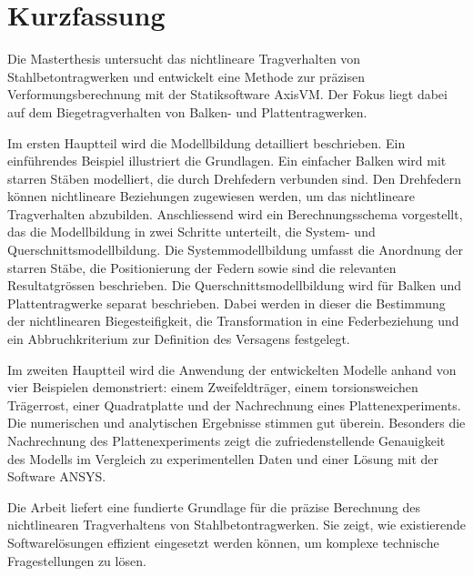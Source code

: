 \chapter*{Kurzfassung}

Die Masterthesis untersucht das nichtlineare Tragverhalten von Stahlbetontragwerken und entwickelt eine Methode zur präzisen Verformungsberechnung mit der Statiksoftware AxisVM. Der Fokus liegt dabei auf dem Biegetragverhalten von Balken- und Plattentragwerken.

Im ersten Hauptteil wird die Modellbildung detailliert beschrieben. Ein einführendes Beispiel illustriert die Grundlagen. Ein einfacher Balken wird mit starren Stäben modelliert, die durch Drehfedern verbunden sind. Den Drehfedern können nichtlineare Beziehungen zugewiesen werden, um das nichtlineare Tragverhalten abzubilden. Anschliessend wird ein Berechnungsschema vorgestellt, das die Modellbildung in zwei Schritte unterteilt, die System- und Querschnittsmodellbildung. Die Systemmodellbildung umfasst die Anordnung der starren Stäbe, die Positionierung der Federn sowie sind die relevanten Resultatgrössen beschrieben. Die Querschnittsmodellbildung wird für Balken und Plattentragwerke separat beschrieben. Dabei werden in dieser die Bestimmung der nichtlinearen Biegesteifigkeit, die Transformation in eine Federbeziehung und ein Abbruchkriterium zur Definition des Versagens festgelegt.

Im zweiten Hauptteil wird die Anwendung der entwickelten Modelle anhand von vier Beispielen demonstriert: einem Zweifeldträger, einem torsionsweichen Trägerrost, einer Quadratplatte und der Nachrechnung eines Plattenexperiments. Die numerischen und analytischen Ergebnisse stimmen gut überein. Besonders die Nachrechnung des Plattenexperiments zeigt die zufriedenstellende Genauigkeit des Modells im Vergleich zu experimentellen Daten und einer Lösung mit der Software ANSYS.

Die Arbeit liefert eine fundierte Grundlage für die präzise Berechnung des nichtlinearen Tragverhaltens von Stahlbetontragwerken. Sie zeigt, wie existierende Softwarelösungen effizient eingesetzt werden können, um komplexe technische Fragestellungen zu lösen.